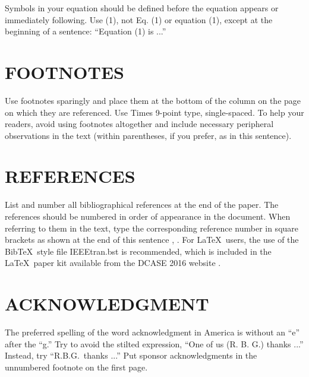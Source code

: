 \documentclass{article}
\begin{document}
\begin{sloppy}
Symbols in your equation should be defined before the equation 
appears or immediately following.  Use (1), not Eq. (1) or 
equation (1), except at the beginning of a sentence:  
``Equation (1) is ...''



\section{FOOTNOTES}
\label{sec:foot}

Use footnotes sparingly and place them at 
the bottom of the column on the page on which they are 
referenced. Use Times 9-point type, single-spaced. To 
help your readers, avoid using footnotes altogether and
include necessary peripheral observations in the text 
(within parentheses, if you prefer, as in this sentence).

\section{REFERENCES}
\label{sec:ref}

List and number all bibliographical references at the end 
of the paper. The references should be numbered in order 
of appearance in the document. When referring to them in 
the text, type the corresponding reference number in 
square brackets as shown at the end of this sentence 
\cite{cJones2003}, \cite{aSmith2000}. For \LaTeX\ users, 
the use of the Bib\TeX\ style file IEEEtran.bst is 
recommended, which is included in the \LaTeX\ paper 
kit available from the DCASE 2016 website \cite{dcase2016web}.

\section{ACKNOWLEDGMENT}
\label{sec:ack}

The preferred spelling of the word acknowledgment in 
America is without an ``e'' after the ``g.'' Try to avoid 
the stilted expression, ``One of us (R. B. G.) thanks ...''
Instead, try ``R.B.G.\ thanks ...''  Put sponsor 
acknowledgments in the unnumbered footnote on the first page.


\end{sloppy}
\end{document}
